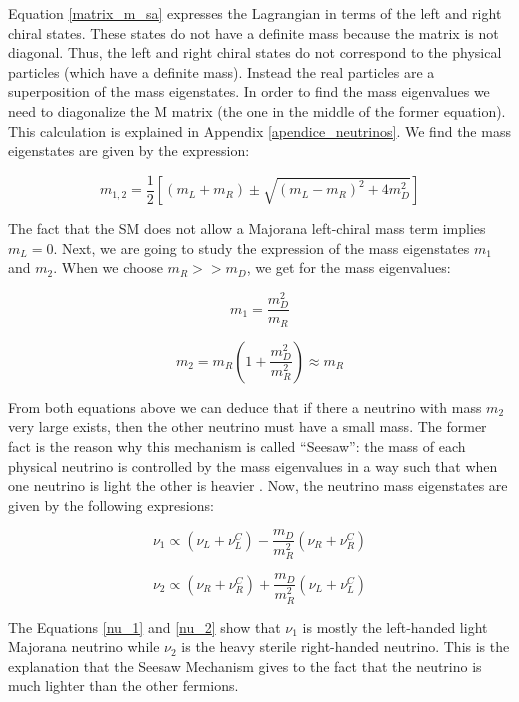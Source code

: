 Equation \ref{matrix_m_sa} expresses the Lagrangian in terms of the left and right chiral states. These states do not have a definite mass because the matrix is not diagonal. 
Thus, the left and right chiral states do not correspond to the physical particles (which have a definite mass). Instead the real particles are a superposition of the 
mass eigenstates. In order to find the mass eigenvalues we need to diagonalize the M matrix (the one in the middle of the former equation). This calculation is 
explained in Appendix \ref{apendice_neutrinos}. We find the mass eigenstates are given by the expression:

\begin{equation}
m_{1,2} = \frac{1}{2} \left[ (m_L + m_R) \pm \sqrt{(m_L - m_R)^2 + 4m_D^2} \right]
\end{equation}
 
The fact that the SM does not allow a Majorana left-chiral mass term implies $m_L = 0$. Next, we are going to study the expression of the mass eigenstates $m_1$ and $m_2$. 
When we choose $m_R >> m_D$, we get for the mass eigenvalues:

\begin{equation}
m_1 = \frac{m_D^2}{m_R}
\end{equation}

\begin{equation}
m_2 = m_R \left( 1 + \frac{m_D^2}{m_R^2}\right) \approx m_R 
\end{equation}
 
From both equations above we can deduce that if there a neutrino with mass $m_2$ very large exists, then the other neutrino must have a small mass. 
The former fact is the reason why this mechanism is called ``Seesaw'': the mass of each physical neutrino is controlled by the mass eigenvalues in a way such that when one neutrino is light
the other is heavier \cite{Theory_neutrinos_book}. Now, the neutrino mass eigenstates are given by the following expresions:

\begin{equation}
\label{nu_1}
\nu_1 \propto \left( \nu_L + \nu_L^C \right) - \frac{m_D}{m_R^2} \left( \nu_R + \nu_R^C \right)
\end{equation}

\begin{equation}
\label{nu_2}
\nu_2 \propto \left( \nu_R + \nu_R^C \right) + \frac{m_D}{m_R^2} \left( \nu_L + \nu_L^C \right)
\end{equation}

The Equations \ref{nu_1} and \ref{nu_2} show that $\nu_1$ is mostly the left-handed light Majorana neutrino while $\nu_2$ is the heavy sterile right-handed neutrino. This is the explanation 
that the Seesaw Mechanism gives to the fact that the neutrino is much lighter than the other fermions. 
 
 
 
 
 
 